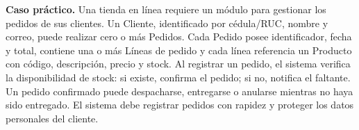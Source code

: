 \documentclass[11pt,a4paper]{article}
\begin{document}
\begin{infobox}
\textbf{Caso práctico.} Una tienda en línea requiere un módulo para gestionar los pedidos de sus clientes. Un Cliente, identificado por cédula/RUC, nombre y correo, puede realizar cero o más Pedidos. Cada Pedido posee identificador, fecha y total, contiene una o más Líneas de pedido y cada línea referencia un Producto con código, descripción, precio y stock. Al registrar un pedido, el sistema verifica la disponibilidad de stock: si existe, confirma el pedido; si no, notifica el faltante. Un pedido confirmado puede despacharse, entregarse o anularse mientras no haya sido entregado. El sistema debe registrar pedidos con rapidez y proteger los datos personales del cliente.
\end{infobox}

\end{document}
